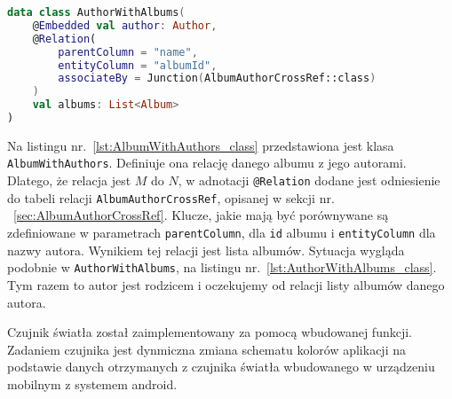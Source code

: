 \begin{lstlisting}[caption=Deklaracja relacji \texttt{AuthorWithAlbums}, label={lst:AuthorWithAlbums_class}, language=kotlin]
data class AuthorWithAlbums(
    @Embedded val author: Author,
    @Relation(
        parentColumn = "name",
        entityColumn = "albumId",
        associateBy = Junction(AlbumAuthorCrossRef::class)
    )
    val albums: List<Album>
)
\end{lstlisting}

Na listingu nr.~\ref{lst:AlbumWithAuthors_class} przedstawiona jest klasa \texttt{AlbumWithAuthors}. Definiuje ona relację danego albumu z jego autorami. Dlatego, że relacja jest $M$ do $N$, w adnotacji \texttt{@Relation} dodane jest odniesienie do tabeli relacji \texttt{AlbumAuthorCrossRef}, opisanej w sekcji nr. ~\ref{sec:AlbumAuthorCrossRef}. Klucze, jakie mają być porównywane są zdefiniowane w parametrach \texttt{parentColumn}, dla \texttt{id} albumu i \texttt{entityColumn} dla nazwy autora. Wynikiem tej relacji jest lista albumów. Sytuacja wygląda podobnie w \texttt{AuthorWithAlbums}, na listingu nr.~\ref{lst:AuthorWithAlbums_class}. Tym razem to autor jest rodzicem i oczekujemy od relacji listy albumów danego autora.

Czujnik światła został zaimplementowany za pomocą wbudowanej funkcji. Zadaniem czujnika jest dynmiczna zmiana schematu kolorów aplikacji na podstawie danych otrzymanych z czujnika światła wbudowanego w urządzeniu mobilnym z systemem android.

